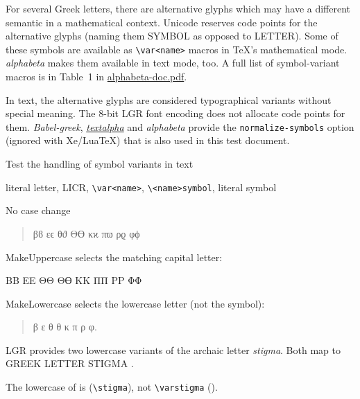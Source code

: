 \documentclass[a4paper]{article}
\newcommand*{\Greek}{\foreignlanguage{greek}}
\newcommand*{\Greek}{\ensuregreek}
\newcommand{\cs}[1]{\texttt{\textbackslash#1}}
\begin{document}
For several Greek letters, there are alternative glyphs which may
have a different semantic in a mathematical context.
Unicode reserves code points for the alternative glyphs
(naming them SYMBOL as opposed to LETTER).
Some of these symbols are available as \cs{var<name>} macros in TeX's
mathematical mode. \emph{alphabeta} makes them available in text mode, too.
A full list of symbol-variant macros is in Table~1 in
\href{alphabeta-doc.pdf}{alphabeta-doc.pdf}.

In text, the alternative glyphs are considered typographical variants
without special meaning. The 8-bit LGR font encoding does not allocate
code points for them. \emph{Babel-greek}, \emph{%
\href{http://mirrors.ctan.org/language/greek/greek-fontenc/textalpha-doc.pdf}
{textalpha}} and \emph{alphabeta} provide the \texttt{normalize-symbols} option
(ignored with Xe/LuaTeX) that is also used in this test document.

\smallskip\noindent
Test the handling of symbol variants in text

literal letter, LICR, \cs{var<name>}, \cs{<name>symbol}, literal symbol

\newcommand{\symbolvariants}{
  β\beta    \varbeta    \betasymbol    ϐ
  ε\epsilon \varepsilon \epsilonsymbol ϵ
  θ\theta   \vartheta   \thetasymbol   ϑ
  Θ\Theta   \varTheta   \Thetasymbol   ϴ
  κ\kappa   \varkappa   \kappasymbol   ϰ
  π\pi      \varpi      \pisymbol      ϖ
  ρ\rho     \varrho     \rhosymbol     ϱ
  φ\phi     \varphi     \phisymbol     ϕ
}

\noindent
No case change
\begin{quote}
  \Greek{\symbolvariants}
\end{quote}
%
MakeUppercase selects the matching capital letter:

\begin{center}
  \Greek{\MakeUppercase{\symbolvariants}}
\end{center}

\noindent
MakeLowercase selects the lowercase letter (not the symbol):
\begin{quote}
 \Greek{
  \MakeLowercase{\Beta Β \Epsilon Ε
                  \Theta Θ \Thetasymbol ϴ
                  \Kappa Κ \Pi Π \Rho Ρ \Phi Φ}}.
\end{quote}
\ifdefined \UnicodeEncodingName
\else
  LGR provides two lowercase variants of the archaic letter \emph{stigma}.
  Both map to GREEK LETTER STIGMA .

  The lowercase of  is 
  (\verb|\stigma|), not \verb|\varstigma|  (\ensuregreek\varstigma).
\fi
\end{document}
